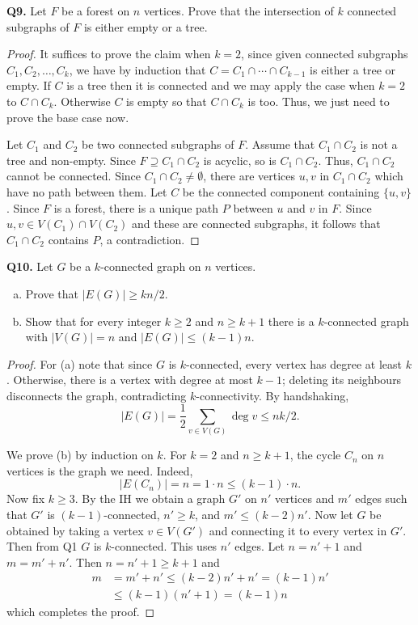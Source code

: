\documentclass{article}
\begin{document}
\noindent \textbf{Q9.} Let \( F \) be a forest on \( n \) vertices. Prove that the intersection of \( k \) connected subgraphs of \( F \) is either empty or a tree.
\begin{proof}
It suffices to prove the claim when \( k = 2 \), since given connected subgraphs \( C_1, C_2, \hdots , C_{k}  \), we have by induction that \(C = C_1 \cap \cdots \cap C_{k-1}  \) is either a tree or empty. If \( C \) is a tree then it is connected and we may apply the case when \( k = 2 \) to \( C \cap C_{k}  \). Otherwise \( C \) is empty so that \( C \cap C_{k}  \) is too. Thus, we just need to prove the base case now.

Let \( C_1 \) and \( C_2 \) be two connected subgraphs of \( F \). Assume that \( C_1 \cap C_2 \) is not a tree and non-empty. Since \( F \supseteq C_1 \cap C_2 \) is acyclic, so is \( C_1 \cap C_2 \). Thus, \( C_1 \cap C_2 \) cannot be connected. Since \( C_1 \cap C_2 \neq \emptyset  \), there are vertices \( u,v \) in \( C_1 \cap C_2 \) which have no path between them. Let \( C \) be the connected component containing \( \{ u,v \}  \). Since \( F \) is a forest, there is a unique path \( P \) between \( u \) and \( v \) in \( F \). Since \( u,v \in V(C_1) \cap V(C_2)\) and these are connected subgraphs, it follows that \( C_1 \cap C_2 \) contains \( P \), a contradiction.
\end{proof}
\noindent \textbf{Q10.} Let \( G \) be a \( k \)-connected graph on \( n \) vertices. 
\begin{enumerate}[(a)]
	\item Prove that \( |E(G)| \geq kn/2 \).
	\item Show that for every integer \( k \geq 2 \) and \( n \geq k + 1 \) there is a \( k \)-connected graph with \( |V(G)| = n \) and \( |E(G)| \leq (k-1)n \).
\end{enumerate}
\begin{proof}
	For (a) note that since \( G \) is \( k \)-connected, every vertex has degree at least \( k \). Otherwise, there is a vertex with degree at most \( k - 1 \); deleting its neighbours disconnects the graph, contradicting \( k \)-connectivity. By handshaking, \[|E(G)| = \frac{1}{2}  \sum_{v \in V(G)}^{} \deg v \leq nk/2.  \] 

We prove (b) by induction on \( k \). For \( k = 2 \) and \( n \geq k + 1 \), the cycle \( C_{n}  \) on \( n \) vertices is the graph we need. Indeed, \[ |E(C_{n})| = n = 1 \cdot n \leq (k-1)\cdot n. \] Now fix \( k\geq 3 \). By the IH we obtain a graph \( G' \) on \( n' \) vertices and \( m' \) edges such that \( G' \) is \( (k-1) \)-connected, \( n' \geq k \), and \( m' \leq (k - 2)n' \). Now let \( G \) be obtained by taking a vertex \( v \in V(G') \) and connecting it to every vertex in \( G' \). Then from Q1 \( G \) is \( k \)-connected. This uses \( n' \) edges. Let \( n = n' + 1 \) and \( m = m' + n' \). Then \( n = n' + 1 \geq k + 1 \) and
	\begin{align*}
		m &= m' + n' \leq (k-2)n' + n' = (k-1)n' \\ 
		  &\leq (k-1)(n' + 1) = (k-1)n
	\end{align*}
which completes the proof.
\end{proof}
\end{document}

